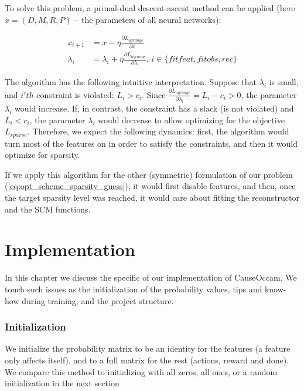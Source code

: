 \documentclass[a4paper,11pt,oneside]{report}
\newcommand{\sysname}{CauseOccam\xspace}
\begin{document}
To solve this problem, a primal-dual descent-ascent method can be applied \cite{Franceschi2019} (here $x=(D,M,R,P)$ -- the parameters of all neural networks):

\begin{equation}
\label{eq:primaldual}
\begin{array}{rl}
x_{t+1}&=x-\eta\frac{\partial L_{agrange}}{\partial x}\\
\lambda_i&=\lambda_i+\eta\frac{\partial L_{agrange}}{\partial \lambda_i},\,i\in\{fitfeat,fitobs,rec\}
\end{array}
\end{equation}

The algorithm has the following intuitive interpretation. Suppose that $\lambda_i$ is small, and $i'th$ constraint is violated: $L_i>c_i$. Since $\frac{\partial L_{agrange}}{\partial \lambda_i}=L_i-c_i>0$, the parameter $\lambda_i$ would increase. If, in contrast, the constraint has a slack (is not violated) and $L_i<c_i$, the parameter $\lambda_i$ would decrease to allow optimizing for the objective $L_{sparse}$.
Therefore, we expect the following dynamics: first, the algorithm would turn most of the features on in order to satisfy the constraints, and then it would optimize for sparsity.

If we apply this algorithm for the other (symmetric) formulation of our problem (\autoref{eq:opt_scheme_sparsity_guess}), it would first disable features, and then, once the target sparsity level was reached, it would care about fitting the reconstructor and the SCM functions.




\chapter{Implementation}
\label{ch:implementation}
In this chapter we discuss the specific of our implementation of \sysname. We touch such issues as the initialization of the probability values, tips and know-how during training, and the project structure.

\subsection{Initialization}
We initialize the probability matrix to be an identity for the features (a feature only affects itself), and to a full matrix for the rest (actions, reward and done). We compare this method to initializing with all zeros, all ones, or a random initialization in the next section
\end{document}

